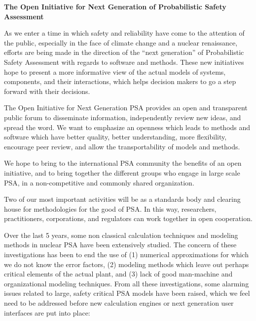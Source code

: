 \documentclass[11pt]{article}
\begin{document}
\textbf{The Open Initiative for Next Generation of Probabilistic Safety Assessment}

As we enter a time in which safety and reliability have come to the
attention of the public, especially in the face of climate change and a
nuclear renaissance, efforts are being made in the direction of the
``next generation'' of Probabilistic Safety Assessment with regards to
software and methods. These new initiatives hope to present a more
informative view of the actual models of systems, components, and their
interactions, which helps decision makers to go a step forward with
their decisions.

The Open Initiative for Next Generation PSA provides an open and
transparent public forum to disseminate information, independently
review new ideas, and spread the word. We want to emphasize an openness
which leads to methods and software which have better quality, better
understanding, more flexibility, encourage peer review, and allow the
transportability of models and methods.

We hope to bring to the international PSA community the benefits of an
open initiative, and to bring together the different groups who engage
in large scale PSA, in a non-competitive and commonly shared
organization.

Two of our most important activities will be as a standards body and
clearing house for methodologies for the good of PSA. In this way,
researchers, practitioners, corporations, and regulators can work
together in open cooperation.

Over the last 5 years, some non classical calculation techniques and
modeling methods in nuclear PSA have been extensively studied. The
concern of these investigations has been to end the use of (1) numerical
approximations for which we do not know the error factors, (2) modeling
methods which leave out perhaps critical elements of the actual plant,
and (3) lack of good man-machine and organizational modeling techniques.
From all these investigations, some alarming issues related to large,
safety critical PSA models have been raised, which we feel need to be
addressed before new calculation engines or next generation user
interfaces are put into place:
\end{document}
